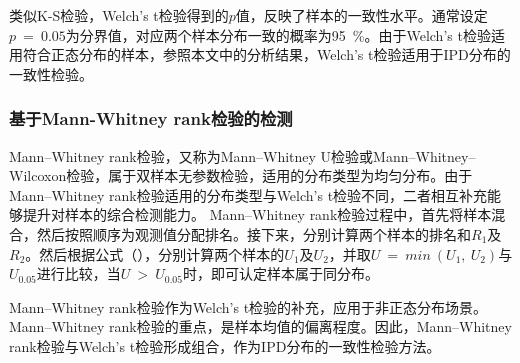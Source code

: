 类似K-S检验，Welch's t检验得到的$p$值，反映了样本的一致性水平。通常设定$p\ =\ 0.05$为分界值，对应两个样本分布一致的概率为95\ \%。由于Welch's t检验适用符合正态分布的样本，参照本文中的分析结果，Welch's t检验适用于IPD分布的一致性检验。

\subsubsection{基于Mann-Whitney rank检验的检测}
\label{chap:analyze:statistical:test:mw}

Mann–Whitney rank检验，又称为Mann–Whitney U检验或Mann–Whitney–Wilcoxon检验，属于双样本无参数检验，适用的分布类型为均匀分布。由于Mann–Whitney rank检验适用的分布类型与Welch's t检验不同，二者相互补充能够提升对样本的综合检测能力。
Mann–Whitney rank检验过程中，首先将样本混合，然后按照顺序为观测值分配排名。接下来，分别计算两个样本的排名和$R_{1}$及$R_{2}$。然后根据公式（），分别计算两个样本的$U_{1}$及$U_{2}$，并取$U\ =\ min\ (U_{1},\ U_{2})$与$U_{0.05}$进行比较，当$U\ >\ U_{0.05}$时，即可认定样本属于同分布。

Mann–Whitney rank检验作为Welch's t检验的补充，应用于非正态分布场景。Mann–Whitney rank检验的重点，是样本均值的偏离程度。因此，Mann–Whitney rank检验与Welch's t检验形成组合，作为IPD分布的一致性检验方法。


